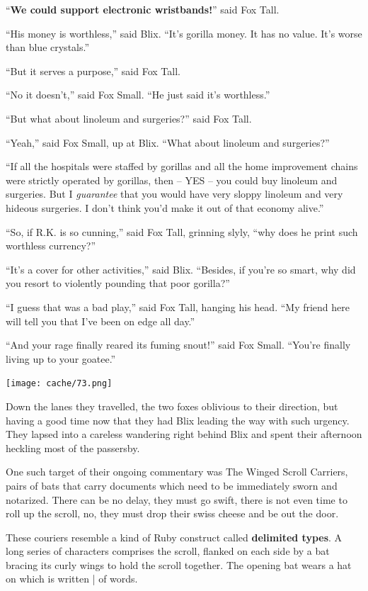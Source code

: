 \documentclass[12pt,twoside]{report}
\begin{document}
``{\bf We could support electronic wristbands!}'' said Fox Tall.

``His money is worthless,'' said Blix.  ``It's gorilla money.  It has
no value.  It's worse than blue crystals.''

``But it serves a purpose,'' said Fox Tall.

``No it doesn't,'' said Fox Small.  ``He just said it's worthless.''

``But what about linoleum and surgeries?'' said Fox Tall.

``Yeah,'' said Fox Small, up at Blix.  ``What about linoleum and
surgeries?''

``If all the hospitals were staffed by gorillas and all the home
improvement chains were strictly operated by gorillas, then -- YES --
you could buy linoleum and surgeries.  But I {\em guarantee} that you
would have very sloppy linoleum and very hideous surgeries.  I don't
think you'd make it out of that economy alive.''

``So, if R.K. is so cunning,'' said Fox Tall, grinning slyly, ``why
does he print such worthless currency?''

``It's a cover for other activities,'' said Blix.  ``Besides, if
you're so smart, why did you resort to violently pounding that poor
gorilla?''

``I guess that was a bad play,'' said Fox Tall, hanging his head.
``My friend here will tell you that I've been on edge all day.''

``And your rage finally reared its fuming snout!'' said Fox Small.
``You're finally living up to your goatee.''

	\texttt{[image: cache/73.png]}

Down the lanes they travelled, the two foxes oblivious to their
direction, but having a good time now that they had Blix leading the
way with such urgency.  They lapsed into a careless wandering right
behind Blix and spent their afternoon heckling most of the passersby.

One such target of their ongoing commentary was The Winged Scroll
Carriers, pairs of bats that carry documents which need to be
immediately sworn and notarized.  There can be no delay, they must go
swift, there is not even time to roll up the scroll, no, they must
drop their swiss cheese and be out the door.

These couriers resemble a kind of Ruby construct called {\bf delimited
  types}.  A long series of characters comprises the scroll, flanked
on each side by a bat bracing its curly wings to hold the scroll
together. The opening bat wears a hat on which is written
\rubyinline|%
of words.
\end{document}

